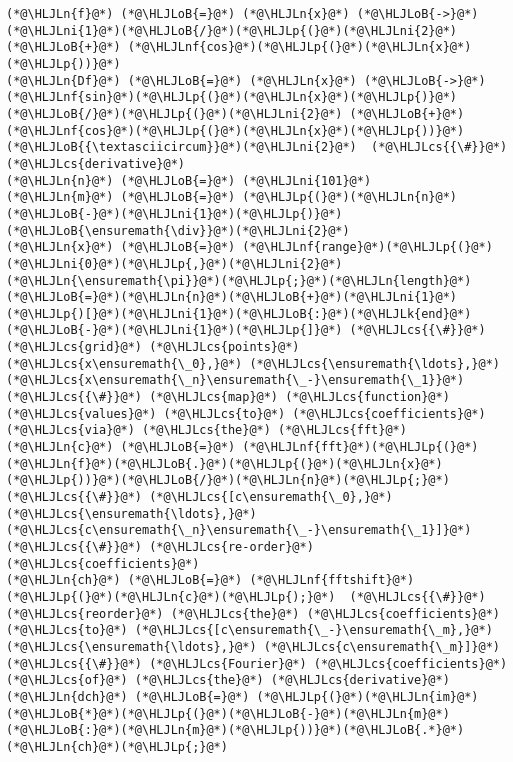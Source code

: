 \documentclass[12pt,a4paper]{article}
\newcommand{\HLJLk}[1]{\textcolor[RGB]{148,91,176}{\textbf{#1}}}
\newcommand{\HLJLn}[1]{#1}
\newcommand{\HLJLnf}[1]{\textcolor[RGB]{66,102,213}{#1}}
\newcommand{\HLJLni}[1]{\textcolor[RGB]{59,151,46}{#1}}
\newcommand{\HLJLoB}[1]{\textcolor[RGB]{102,102,102}{\textbf{#1}}}
\newcommand{\HLJLp}[1]{#1}
\newcommand{\HLJLcs}[1]{\textcolor[RGB]{153,153,119}{\textit{#1}}}
\begin{document}
\begin{lstlisting}
(*@\HLJLn{f}@*) (*@\HLJLoB{=}@*) (*@\HLJLn{x}@*) (*@\HLJLoB{->}@*) (*@\HLJLni{1}@*)(*@\HLJLoB{/}@*)(*@\HLJLp{(}@*)(*@\HLJLni{2}@*) (*@\HLJLoB{+}@*) (*@\HLJLnf{cos}@*)(*@\HLJLp{(}@*)(*@\HLJLn{x}@*)(*@\HLJLp{))}@*)
(*@\HLJLn{Df}@*) (*@\HLJLoB{=}@*) (*@\HLJLn{x}@*) (*@\HLJLoB{->}@*) (*@\HLJLnf{sin}@*)(*@\HLJLp{(}@*)(*@\HLJLn{x}@*)(*@\HLJLp{)}@*)(*@\HLJLoB{/}@*)(*@\HLJLp{(}@*)(*@\HLJLni{2}@*) (*@\HLJLoB{+}@*) (*@\HLJLnf{cos}@*)(*@\HLJLp{(}@*)(*@\HLJLn{x}@*)(*@\HLJLp{))}@*)(*@\HLJLoB{{\textasciicircum}}@*)(*@\HLJLni{2}@*)  (*@\HLJLcs{{\#}}@*) (*@\HLJLcs{derivative}@*)
(*@\HLJLn{n}@*) (*@\HLJLoB{=}@*) (*@\HLJLni{101}@*)
(*@\HLJLn{m}@*) (*@\HLJLoB{=}@*) (*@\HLJLp{(}@*)(*@\HLJLn{n}@*)(*@\HLJLoB{-}@*)(*@\HLJLni{1}@*)(*@\HLJLp{)}@*)(*@\HLJLoB{\ensuremath{\div}}@*)(*@\HLJLni{2}@*)
(*@\HLJLn{x}@*) (*@\HLJLoB{=}@*) (*@\HLJLnf{range}@*)(*@\HLJLp{(}@*)(*@\HLJLni{0}@*)(*@\HLJLp{,}@*)(*@\HLJLni{2}@*)(*@\HLJLn{\ensuremath{\pi}}@*)(*@\HLJLp{;}@*)(*@\HLJLn{length}@*)(*@\HLJLoB{=}@*)(*@\HLJLn{n}@*)(*@\HLJLoB{+}@*)(*@\HLJLni{1}@*)(*@\HLJLp{)[}@*)(*@\HLJLni{1}@*)(*@\HLJLoB{:}@*)(*@\HLJLk{end}@*)(*@\HLJLoB{-}@*)(*@\HLJLni{1}@*)(*@\HLJLp{]}@*) (*@\HLJLcs{{\#}}@*) (*@\HLJLcs{grid}@*) (*@\HLJLcs{points}@*) (*@\HLJLcs{x\ensuremath{\_0},}@*) (*@\HLJLcs{\ensuremath{\ldots},}@*) (*@\HLJLcs{x\ensuremath{\_n}\ensuremath{\_-}\ensuremath{\_1}}@*)
(*@\HLJLcs{{\#}}@*) (*@\HLJLcs{map}@*) (*@\HLJLcs{function}@*) (*@\HLJLcs{values}@*) (*@\HLJLcs{to}@*) (*@\HLJLcs{coefficients}@*) (*@\HLJLcs{via}@*) (*@\HLJLcs{the}@*) (*@\HLJLcs{fft}@*)
(*@\HLJLn{c}@*) (*@\HLJLoB{=}@*) (*@\HLJLnf{fft}@*)(*@\HLJLp{(}@*)(*@\HLJLn{f}@*)(*@\HLJLoB{.}@*)(*@\HLJLp{(}@*)(*@\HLJLn{x}@*)(*@\HLJLp{))}@*)(*@\HLJLoB{/}@*)(*@\HLJLn{n}@*)(*@\HLJLp{;}@*) (*@\HLJLcs{{\#}}@*) (*@\HLJLcs{[c\ensuremath{\_0},}@*) (*@\HLJLcs{\ensuremath{\ldots},}@*) (*@\HLJLcs{c\ensuremath{\_n}\ensuremath{\_-}\ensuremath{\_1}]}@*)
(*@\HLJLcs{{\#}}@*) (*@\HLJLcs{re-order}@*) (*@\HLJLcs{coefficients}@*)
(*@\HLJLn{ch}@*) (*@\HLJLoB{=}@*) (*@\HLJLnf{fftshift}@*)(*@\HLJLp{(}@*)(*@\HLJLn{c}@*)(*@\HLJLp{);}@*)  (*@\HLJLcs{{\#}}@*) (*@\HLJLcs{reorder}@*) (*@\HLJLcs{the}@*) (*@\HLJLcs{coefficients}@*) (*@\HLJLcs{to}@*) (*@\HLJLcs{[c\ensuremath{\_-}\ensuremath{\_m},}@*) (*@\HLJLcs{\ensuremath{\ldots},}@*) (*@\HLJLcs{c\ensuremath{\_m}]}@*)
(*@\HLJLcs{{\#}}@*) (*@\HLJLcs{Fourier}@*) (*@\HLJLcs{coefficients}@*) (*@\HLJLcs{of}@*) (*@\HLJLcs{the}@*) (*@\HLJLcs{derivative}@*)
(*@\HLJLn{dch}@*) (*@\HLJLoB{=}@*) (*@\HLJLp{(}@*)(*@\HLJLn{im}@*)(*@\HLJLoB{*}@*)(*@\HLJLp{(}@*)(*@\HLJLoB{-}@*)(*@\HLJLn{m}@*)(*@\HLJLoB{:}@*)(*@\HLJLn{m}@*)(*@\HLJLp{))}@*)(*@\HLJLoB{.*}@*)(*@\HLJLn{ch}@*)(*@\HLJLp{;}@*)

\end{lstlisting}
\end{document}

